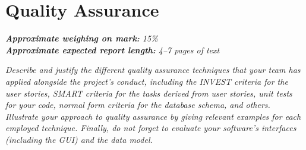 \section{Quality Assurance}
\label{sec:quality_assurance}

\emph{\textbf{Approximate weighing on mark:} 15\%}						\\
\emph{\textbf{Approximate expected report length:} 4--7 pages of text}

\emph{Describe and justify the different quality assurance techniques that your team has applied alongside the project's conduct, including the INVEST criteria for the user stories, SMART criteria for the tasks derived from user stories, unit tests for your code, normal form criteria for the database schema, and others. Illustrate your approach to quality assurance by giving relevant examples for each employed technique. Finally, do not forget to evaluate your software's interfaces (including the GUI) and the data model.}

